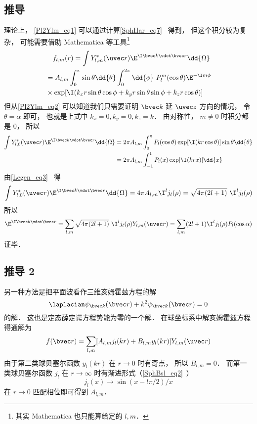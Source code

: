\subsection{推导}
理论上， \autoref{Pl2Ylm_eq1} 可以通过计算\autoref{SphHar_eq7}~ 得到， 但这个积分较为复杂， 可能需要借助 Mathematica 等工具\footnote{其实 Mathematica 也只能算给定的 $l, m$．}
\begin{equation}
\begin{aligned}
&\quad f_{l,m}(r) = \int Y_{l,m}^*(\uvec r)\E^{\I \bvec k \vdot \bvec r} \dd{\Omega}\\
&= A_{l,m}\int_0^\pi \sin\theta\dd{\theta} \int_0^{2\pi} \dd{\phi} \,\,P_l^m(\cos\theta) \E^{-\I m \phi}\\
&\times \exp[\I (k_x r \sin\theta\cos\phi + k_y r \sin\theta\sin\phi + k_z r \cos\theta)]
\end{aligned}
\end{equation}
但从\autoref{Pl2Ylm_eq2} 可以知道我们只需要证明 $\bvec k$ 延 $\uvec z$ 方向的情况， 令 $\theta = \alpha$ 即可， 也就是上式中 $k_x = 0, k_y = 0, k_z = k$． 由对称性， $m \ne 0$ 时积分都是 0， 所以
\begin{equation}
\begin{aligned}
\int Y_{l,0}^*(\uvec r)\E^{\I \bvec k \vdot \bvec r} \dd{\Omega}
&= 2\pi A_{l,m}\int_0^\pi P_l(\cos\theta) \exp[\I (k r \cos\theta)] \sin\theta\dd{\theta}\\
&= 2\pi A_{l,m}\int_{-1}^1 P_l(x) \exp[\I (k r x)] \dd{x}
\end{aligned}
\end{equation}
由\autoref{Legen_eq3}~ 得
\begin{equation}
\int Y_{l,0}^*(\uvec r)\E^{\I \bvec k \vdot \bvec r} \dd{\Omega}
= 4\pi A_{l,m} \I^l j_l(\rho)
= \sqrt{4\pi (2l + 1)}\ \I^l j_l(\rho)
\end{equation}
所以
\begin{equation}
\E^{\I \bvec k \vdot \bvec r} = \sum_{l,m} \sqrt{4\pi (2l + 1)}\ \I^l j_l(\rho) Y_{l,m}(\uvec r)
=\sum_{l,m} (2l + 1) \I^l j_l(\rho) P_l(\cos\alpha)
\end{equation}
证毕．

\subsection{推导 2}
另一种方法是把平面波看作三维亥姆霍兹方程的解
\begin{equation}
\laplacian \psi_{\bvec k}(\bvec r) + k^2 \psi_{\bvec k}(\bvec r) = 0
\end{equation}
的解． 这也是定态薛定谔方程势能为零的一个解． 在球坐标系中解亥姆霍兹方程 得通解为
\begin{equation}
f(\bvec r) = \sum_{l,m} [A_{l,m} j_l(kr) + B_{l,m} y_l(kr)] Y_{l,m}(\uvec r)
\end{equation}
由于第二类球贝塞尔函数 $y_l(kr)$ 在 $r\to 0$ 时有奇点， 所以 $B_{l,m} = 0$． 而第一类球贝塞尔函数 $j_l$ 在 $r\to \infty$ 时有渐进形式（\autoref{SphBsl_eq2}~）
\begin{equation}
j_l(x) \to \sin(x - l\pi /2)/x
\end{equation}
在 $r\to 0$ 匹配相位即可得到 $A_{l,m}$．
